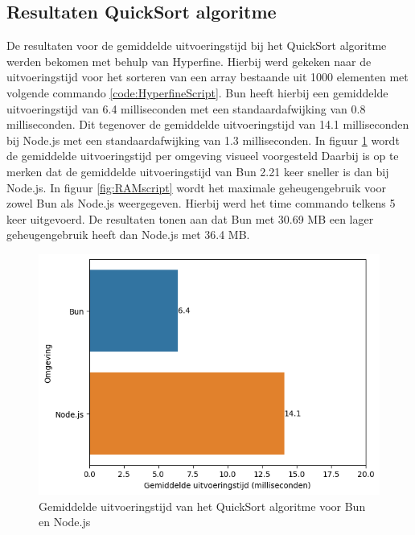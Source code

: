 \subsection{Resultaten  QuickSort algoritme}
De resultaten voor de gemiddelde uitvoeringstijd bij het QuickSort algoritme werden bekomen met behulp van Hyperfine.
Hierbij werd gekeken naar de uitvoeringstijd voor het sorteren van een array bestaande uit 1000 elementen met volgende commando \ref{code:HyperfineScript}.
Bun heeft hierbij een gemiddelde uitvoeringstijd van 6.4 milliseconden met een standaardafwijking van 0.8 milliseconden. 
Dit tegenover de gemiddelde uitvoeringstijd van 14.1 milliseconden bij Node.js met een standaardafwijking van 1.3 milliseconden.
In figuur \ref{fig:uitvoeringstijdscript} wordt de gemiddelde uitvoeringstijd per omgeving visueel voorgesteld
Daarbij is op te merken dat de gemiddelde uitvoeringstijd van Bun 2.21 keer sneller is dan bij Node.js.
In figuur \ref{fig:RAMscript} wordt het maximale geheugengebruik voor zowel Bun als Node.js weergegeven. 
Hierbij werd het time commando telkens 5 keer uitgevoerd.
De resultaten tonen aan dat Bun met 30.69 MB een lager geheugengebruik heeft dan Node.js met 36.4 MB.
\begin{figure}[H]
  \centering
  \includegraphics{graphics/scriptuitvoeringstijd.png}
  \caption[Uitvoeringstijd QuickSort algoritme]{\label{fig:uitvoeringstijdscript}Gemiddelde uitvoeringstijd van het QuickSort algoritme voor Bun en Node.js}
\end{figure}

